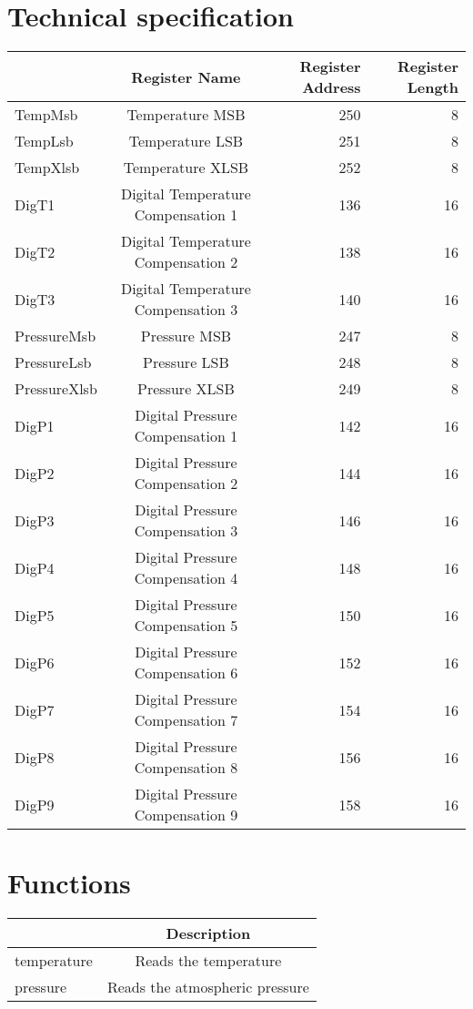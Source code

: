 \documentclass[a4paper,12pt,oneside,pdflatex,italian,final,twocolumn]{article}
\begin{document}
\section{Technical specification}
\centering
\begin{tabular}{lcrr}
\toprule
 & Register Name & Register Address & Register Length \\
\midrule
TempMsb & Temperature MSB & 250 & 8 \\
TempLsb & Temperature LSB & 251 & 8 \\
TempXlsb & Temperature XLSB & 252 & 8 \\
DigT1 & Digital Temperature Compensation 1 & 136 & 16 \\
DigT2 & Digital Temperature Compensation 2 & 138 & 16 \\
DigT3 & Digital Temperature Compensation 3 & 140 & 16 \\
PressureMsb & Pressure MSB & 247 & 8 \\
PressureLsb & Pressure LSB & 248 & 8 \\
PressureXlsb & Pressure XLSB & 249 & 8 \\
DigP1 & Digital Pressure Compensation 1 & 142 & 16 \\
DigP2 & Digital Pressure Compensation 2 & 144 & 16 \\
DigP3 & Digital Pressure Compensation 3 & 146 & 16 \\
DigP4 & Digital Pressure Compensation 4 & 148 & 16 \\
DigP5 & Digital Pressure Compensation 5 & 150 & 16 \\
DigP6 & Digital Pressure Compensation 6 & 152 & 16 \\
DigP7 & Digital Pressure Compensation 7 & 154 & 16 \\
DigP8 & Digital Pressure Compensation 8 & 156 & 16 \\
DigP9 & Digital Pressure Compensation 9 & 158 & 16 \\
\bottomrule
\end{tabular}


\raggedright

\section{Functions}

\centering
\begin{tabular}{lc}
\toprule
  & Description \\
\midrule
temperature & Reads the temperature \\
pressure & Reads the atmospheric pressure \\
\bottomrule
\end{tabular}
\end{document}
